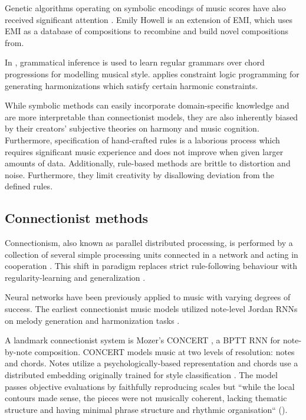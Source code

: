 
Genetic algorithms operating on symbolic encodings of music scores have also
received significant attention \citet{weinberg2007real,cope2010recombinant}.
Emily Howell\citep{cope2005computer} is an extension of EMI, which uses EMI as
a database of compositions to recombine and build novel compositions
from\cite{cope2010recombinant}.

In \citet{cruz1998learning}, grammatical inference is used to learn regular
grammars over chord progressions for modelling musical style.
\citet{tsang1991harmonizing} applies constraint logic programming for
generating harmonizations which satisfy certain harmonic constraints.

While symbolic methods can easily incorporate domain-specific knowledge and are
more interpretable than connectionist models, they are also inherently biased
by their creators' subjective theories on harmony and music cognition.
Furthermore, specification of hand-crafted rules is a laborious process which
requires significant music experience and does not improve when given larger
amounts of data. Additionally, rule-based methods are brittle to distortion and
noise. Furthermore, they limit creativity by disallowing deviation from the
defined rules.

\subsection{Connectionist methods}

Connectionism, also known as parallel distributed processing, is performed by a
collection of several simple processing units connected in a network and acting
in cooperation \citep{pdp1986parallel}. This shift in paradigm replaces strict
rule-following behaviour with regularity-learning and generalization
\citep{dolson1989machine}.

Neural networks have been previously applied to music with varying degrees of
success\citep{griffith1999musical}. The earliest connectionist music models
utilized note-level Jordan RNNs on melody generation and harmonization tasks
\citep{todd1988sequential,todd1989connectionist,bharucha1989modeling}.

A landmark connectionist system is Mozer's CONCERT \citep{mozer1994neural}, a
BPTT RNN for note-by-note composition. CONCERT models music at two
levels of resolution: notes and chords. Notes utilize a psychologically-based
representation \citep{shepard1982geometrical} and chords use a distributed
embedding originally trained for style classification
\citep{laden1989representation}. The model passes objective evaluations by
faithfully reproducing scales but ``while the local contours made sense, the
pieces were not musically coherent, lacking thematic structure and having
minimal phrase structure and rhythmic organisation`` (\citet{mozer1994neural}).

